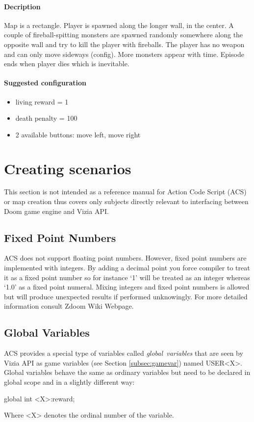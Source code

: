 		\paragraph{Decription}
			Map is a rectangle. Player is spawned along the longer wall, in the center. A couple of fireball-spitting monsters are spawned randomly somewhere along the opposite wall and try to kill the player with fireballs. The player has no weapon and can only move sideways (config). More monsters appear with time. Episode ends when player dies which is inevitable.

		\paragraph{Suggested configuration}
		\begin{itemize}
			\item living reward = 1
			\item death penalty = 100
			\item 2 available buttons: move left, move right
		\end{itemize}
	\newpage

\section{Creating scenarios}\label{sec:creating_scenarios}
	This section is not intended as a reference manual for Action Code Script (ACS) or map creation thus covers only subjects directly relevant to interfacing between Doom game engine and Vizia API.


	\subsection{Fixed Point Numbers}\label{subsec:fixed_point}
		ACS does not support floating point numbers. However, fixed point numbers are implemented with integers. By adding a decimal point you force compiler to treat it as a fixed point number so for instance `1' will be treated as an integer whereas `1.0' as a fixed point numeral. Mixing integers and fixed point numbers is allowed but will produce unexpected results if performed unknowingly. For more detailed information consult Zdoom Wiki Webpage\cite{zdoom-wiki}.

	\subsection{Global Variables}\label{subsec:global_variable}
		ACS provides a special type of variables called \emph{global~variables} that are seen by Vizia API as game variables (see Section \ref{subsec:gamevar}) named USER<X>. Global variables behave the same as ordinary variables but need to be declared in global scope and in a slightly different way:
		\begin{clinee}
global int <X>:reward;
		\end{clinee}
		Where <X> denotes the ordinal number of the variable.
		
